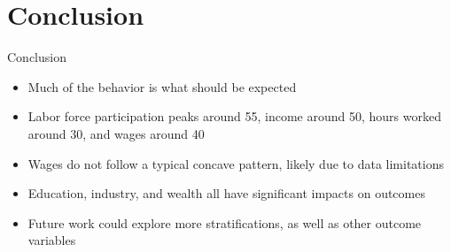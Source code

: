 \documentclass{beamer}
\begin{document}
\section{Conclusion}

\begin{frame}{Conclusion}
  \begin{itemize}
    \item Much of the behavior is what should be expected 
    \item Labor force participation peaks around 55, income around 50, hours worked around 30, and wages around 40
    \item Wages do not follow a typical concave pattern, likely due to data limitations
    \item Education, industry, and wealth all have significant impacts on outcomes
    \item Future work could explore more stratifications, as well as other outcome variables
  \end{itemize}
\end{frame}
\end{document}
